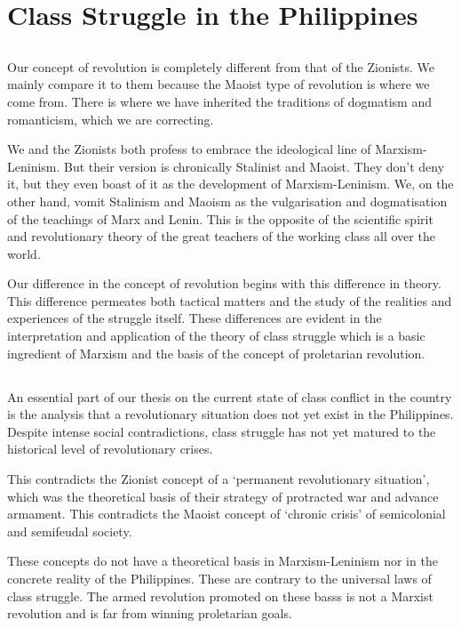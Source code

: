 \documentclass[a4paper,11pt,onesided]{report}
\begin{document}
\chapter{Class Struggle
in the Philippines}
\section{}
Our concept of revolution is completely different from that of the Zionists. 
We mainly compare it to them because the Maoist type of revolution 
is where we come from. 
There is where we have inherited the traditions of dogmatism and romanticism,
which we are correcting.

We and the Zionists both profess to embrace 
the ideological line of Marxism-Leninism. 
But their version is chronically Stalinist and Maoist. 
They don't deny it, 
but they even boast of it as the development of Marxism-Leninism. 
We, on the other hand, vomit Stalinism and Maoism 
as the vulgarisation and dogmatisation of the teachings of Marx and Lenin. 
This is the opposite of the scientific spirit and revolutionary theory 
of the great teachers of the working class all over the world.

Our difference in the concept of revolution begins 
with this difference in theory. 
This difference permeates both tactical matters 
and the study of the realities and experiences of the struggle itself. 
These differences are evident in the interpretation and application 
of the theory of class struggle which is a basic ingredient of Marxism 
and the basis of the concept of proletarian revolution.

\section{}
An essential part of our thesis 
on the current state of class conflict in the country is the analysis 
that a revolutionary situation does not yet exist in the Philippines. 
Despite intense social contradictions, 
class struggle has not yet matured 
to the historical level of revolutionary crises.

This contradicts the Zionist concept of a `permanent revolutionary situation', 
which was the theoretical basis of their strategy 
of protracted war and advance armament. 
This contradicts the Maoist concept of `chronic crisis' 
of semicolonial and semifeudal society.

These concepts do not have a theoretical basis in Marxism-Leninism 
nor in the concrete reality of the Philippines. 
These are contrary to the universal laws of class struggle. 
The armed revolution promoted on these basss 
is not a Marxist revolution 
and is far from winning proletarian goals.
\end{document}

